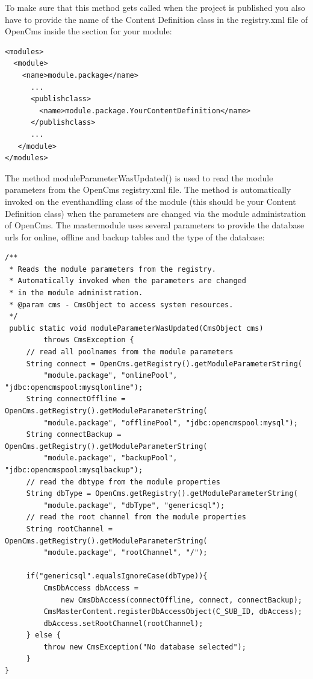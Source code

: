To make sure that this method gets called when the project is published you also have to 
provide the name of the Content Definition class in the {\name registry.xml} file of 
OpenCms inside the section for your module:

\begin{verbatim}
<modules>
  <module>
    <name>module.package</name>
      ...
      <publishclass>
        <name>module.package.YourContentDefinition</name>
      </publishclass>
      ...
   </module>
</modules>
\end{verbatim}

The method {\meth moduleParameterWasUpdated()} is used to read the module parameters from the 
OpenCms {\name registry.xml} file. The method is automatically invoked on the eventhandling class 
of the module (this should be your Content Definition class)
when the parameters are changed via the module administration of OpenCms. The mastermodule uses 
several parameters to provide the database urls for online, offline and backup tables and the type of the database:

\begin{verbatim}
/**
 * Reads the module parameters from the registry.
 * Automatically invoked when the parameters are changed
 * in the module administration.
 * @param cms - CmsObject to access system resources.
 */
 public static void moduleParameterWasUpdated(CmsObject cms) 
         throws CmsException {
     // read all poolnames from the module parameters
     String connect = OpenCms.getRegistry().getModuleParameterString(
         "module.package", "onlinePool", "jdbc:opencmspool:mysqlonline");
     String connectOffline = OpenCms.getRegistry().getModuleParameterString(
         "module.package", "offlinePool", "jdbc:opencmspool:mysql");
     String connectBackup = OpenCms.getRegistry().getModuleParameterString(
         "module.package", "backupPool", "jdbc:opencmspool:mysqlbackup");
     // read the dbtype from the module properties
     String dbType = OpenCms.getRegistry().getModuleParameterString(
         "module.package", "dbType", "genericsql");
     // read the root channel from the module properties
     String rootChannel = OpenCms.getRegistry().getModuleParameterString(
         "module.package", "rootChannel", "/");

     if("genericsql".equalsIgnoreCase(dbType)){
         CmsDbAccess dbAccess = 
		     new CmsDbAccess(connectOffline, connect, connectBackup);
         CmsMasterContent.registerDbAccessObject(C_SUB_ID, dbAccess);
         dbAccess.setRootChannel(rootChannel);
     } else {
         throw new CmsException("No database selected");
     }
}
\end{verbatim}

